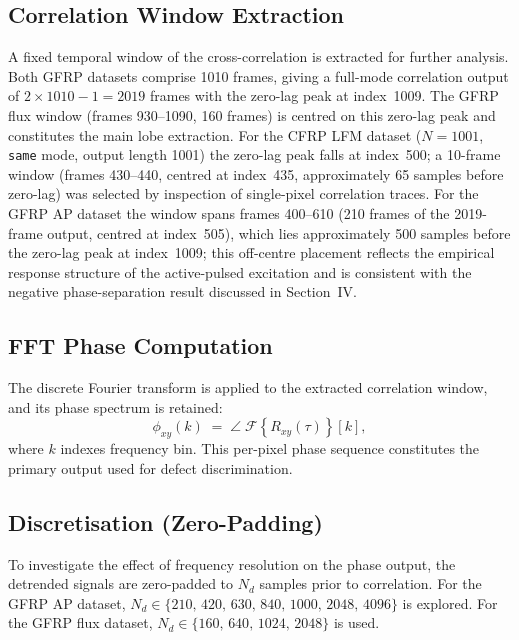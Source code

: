 \documentclass[conference]{IEEEtran}
\begin{document}
  \subsection{Correlation Window Extraction}

  A fixed temporal window of the cross-correlation is extracted for further
  analysis. Both GFRP datasets comprise 1010 frames, giving a full-mode
  correlation output of $2\times1010-1=2019$ frames with the zero-lag peak
  at index~1009. The GFRP flux window (frames 930--1090, 160 frames) is
  centred on this zero-lag peak and constitutes the main lobe extraction.
  For the CFRP LFM dataset ($N=1001$, \texttt{same} mode, output length 1001)
  the zero-lag peak falls at index~500; a 10-frame window (frames 430--440,
  centred at index~435, approximately 65 samples before zero-lag) was selected
  by inspection of single-pixel correlation traces. For the GFRP AP dataset the window spans
  frames 400--610 (210 frames of the 2019-frame output, centred at index~505),
  which lies approximately 500 samples before the zero-lag peak at index~1009;
  this off-centre placement reflects the empirical response structure of the
  active-pulsed excitation and is consistent with the negative phase-separation
  result discussed in Section~IV.

  \subsection{FFT Phase Computation}

  The discrete Fourier transform is applied to the extracted correlation window,
  and its phase spectrum is retained:
  \begin{equation}
      \phi_{xy}(k) \;=\; \angle\;\mathcal{F}\!\left\{R_{xy}(\tau)\right\}[k],
  \end{equation}
  where $k$ indexes frequency bin. This per-pixel phase sequence constitutes
  the primary output used for defect discrimination.

  \subsection{Discretisation (Zero-Padding)}

  To investigate the effect of frequency resolution on the phase output, the
  detrended signals are zero-padded to $N_d$ samples prior to correlation.
  For the GFRP AP dataset, $N_d \in \{210,\,420,\,630,\,840,\,1000,\,2048,\,4096\}$
  is explored. For the GFRP flux dataset,
  $N_d \in \{160,\,640,\,1024,\,2048\}$ is used.
\end{document}
